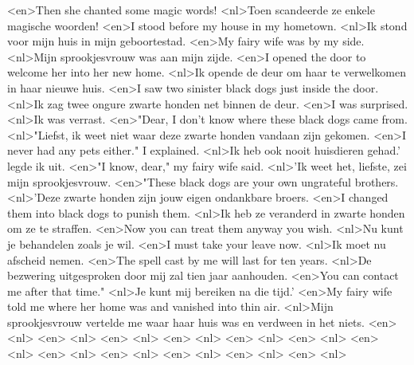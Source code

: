 <en>Then she chanted some magic words!
<nl>Toen scandeerde ze enkele magische woorden!
<en>I stood before my house in my hometown.
<nl>Ik stond voor mijn huis in mijn geboortestad.
<en>My fairy wife was by my side.
<nl>Mijn sprookjesvrouw was aan mijn zijde.
<en>I opened the door to welcome her into her new home.
<nl>Ik opende de deur om haar  te verwelkomen in haar nieuwe huis.
<en>I saw two sinister black dogs just inside the door.
<nl>Ik zag twee ongure zwarte honden net binnen de deur.
<en>I was surprised.
<nl>Ik was verrast.
<en>"Dear, I don't know where these black dogs came from.
<nl>"Liefst, ik weet niet waar deze zwarte honden vandaan zijn gekomen.
<en>I never had any pets either." I explained.
<nl>Ik heb ook nooit huisdieren gehad.' legde ik uit.
<en>"I know, dear," my fairy wife said.
<nl>'Ik weet het, liefste, zei mijn sprookjesvrouw.
<en>"These black dogs are your own ungrateful brothers.
<nl>'Deze zwarte honden zijn jouw eigen ondankbare broers.
<en>I changed them into  black dogs to punish them.
<nl>Ik heb ze  veranderd in zwarte honden om ze te straffen.
<en>Now you can treat them anyway you wish.
<nl>Nu kunt je behandelen zoals je wil.
<en>I must take your leave now.
<nl>Ik moet nu afscheid nemen.
<en>The spell cast by me will last for ten years.
<nl>De bezwering uitgesproken door mij zal tien jaar aanhouden.
<en>You can contact me after that time."
<nl>Je kunt mij bereiken na die tijd.'
<en>My fairy wife told me where her home was and vanished into thin air.
<nl>Mijn sprookjesvrouw vertelde me waar haar huis was en verdween in het niets.
<en>%
<nl>%
<en>%
<nl>%
<en>%
<nl>%
<en>%
<nl>%
<en>%
<nl>%
<en>%
<nl>%
<en>%
<nl>%
<en>%
<nl>%
<en>%
<nl>%
<en>%
<nl>%
<en>%
<nl>%
<en>%
<nl>%

